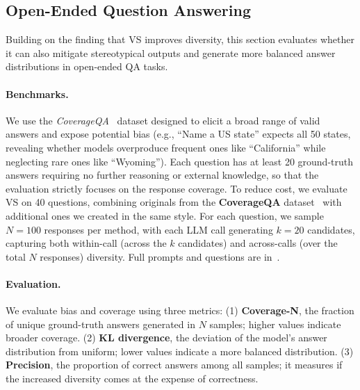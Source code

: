 \subsection{Open-Ended Question Answering}\label{appendix:open_ended_qa}
Building on the finding that VS improves diversity, this section evaluates whether it can also mitigate stereotypical outputs and generate more balanced answer distributions in open-ended QA tasks.


\paragraph{Benchmarks.} We use the \textit{CoverageQA}~\citep{wong2024simplestratdiversifyinglanguagemodel} dataset designed to elicit a broad range of valid answers and expose potential bias (e.g., ``Name a US state''   expects all 50 states, revealing whether models overproduce frequent ones like ``California'' while neglecting rare ones like ``Wyoming''). 
Each question has at least 20 ground-truth answers requiring no further reasoning or external knowledge, so that the evaluation strictly focuses on the response coverage. 
To reduce cost, we evaluate VS on 40 questions, combining originals from the \textbf{CoverageQA} dataset~\citep{wong2024simplestratdiversifyinglanguagemodel} with additional ones we created in the same style.  
For each question, we sample $N=100$ responses per method, with each LLM call generating $k=20$ candidates, capturing both within-call (across the $k$ candidates) and across-calls (over the total $N$ responses) diversity.
Full prompts and questions are in~.

\paragraph{Evaluation.}
We evaluate bias and coverage using three metrics: (1) \textbf{Coverage-N}, the fraction of unique ground-truth answers generated in $N$ samples; higher values indicate broader coverage. (2) \textbf{KL divergence}, the deviation of the model's answer distribution from uniform; %
lower values indicate a more balanced distribution. (3) \textbf{Precision}, the proportion of correct answers among all samples; it measures if the increased diversity comes at the expense of correctness. 

